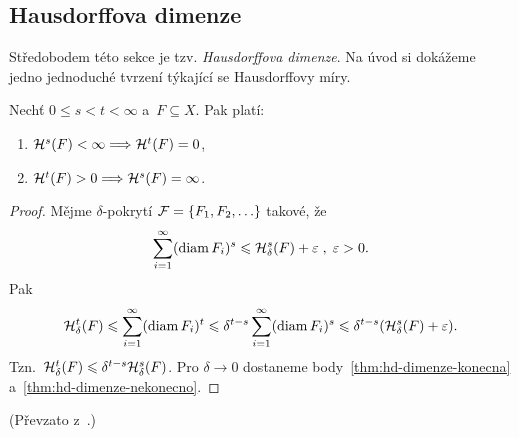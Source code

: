 \subsection{Hausdorffova dimenze}\label{subsec:hausdorffova-dimenze}

Středobodem této sekce je tzv. \emph{Hausdorffova dimenze}. Na úvod si dokážeme jedno jednoduché tvrzení týkající se Hausdorffovy míry.
\begin{theorem}\label{thm:hodnoty-hausdorffovy-miry}
    Nechť $0\leqslant s<t<\infty$ a~$F\subseteq X$. Pak platí:
    \begin{enumerate}[label=(\roman*)]
        \item\label{thm:hd-dimenze-konecna} $\mathcal{H}^{s}(F)<\infty\Longrightarrow\mathcal{H}^{t}(F)=0$,
        \item\label{thm:hd-dimenze-nekonecno} $\mathcal{H}^{t}(F)>0\Longrightarrow\mathcal{H}^{s}(F)=\infty$.
    \end{enumerate}
\end{theorem}
\begin{proof}
    Mějme $\delta$-pokrytí $\mathcal{F}=\left\{F_1,F_2,\ldots\right\}$ takové, že
    \[\sum_{i=1}^{\infty}(\operatorname{diam}{F_i})^s\leqslant\mathcal{H}_{\delta}^{s}(F)+\varepsilon\;,\;\varepsilon>0.\]
    Pak
    \[\mathcal{H}_{\delta}^{t}(F)\leqslant\sum_{i=1}^{\infty}(\operatorname{diam}{F_i})^t\leqslant\delta^{t-s}\sum_{i=1}^{\infty}(\operatorname{diam}{F_i})^s\leqslant\delta^{t-s}(\mathcal{H}_{\delta}^{s}(F)+\varepsilon).\]
    Tzn.~$\mathcal{H}_{\delta}^{t}(F)\leqslant\delta^{t-s}\mathcal{H}_{\delta}^{s}(F)$. Pro $\delta\to 0$ dostaneme body~\ref{thm:hd-dimenze-konecna} a~\ref{thm:hd-dimenze-nekonecno}.
\end{proof}
(Převzato z~\citep[str. 68]{Mattila1995}.)


